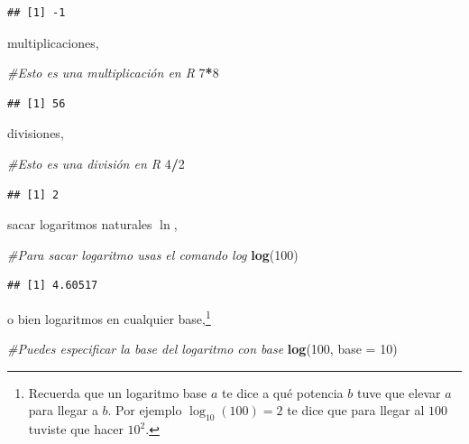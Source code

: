 \documentclass[
]{book}
\newenvironment{Shaded}{\begin{snugshade}}{\end{snugshade}}
\newcommand{\CommentTok}[1]{\textcolor[rgb]{0.56,0.35,0.01}{\textit{#1}}}
\newcommand{\DataTypeTok}[1]{\textcolor[rgb]{0.13,0.29,0.53}{#1}}
\newcommand{\DecValTok}[1]{\textcolor[rgb]{0.00,0.00,0.81}{#1}}
\newcommand{\KeywordTok}[1]{\textcolor[rgb]{0.13,0.29,0.53}{\textbf{#1}}}
\newcommand{\NormalTok}[1]{#1}
\newcommand{\OperatorTok}[1]{\textcolor[rgb]{0.81,0.36,0.00}{\textbf{#1}}}
\begin{document}
\begin{verbatim}
## [1] -1
\end{verbatim}

multiplicaciones,

\begin{Shaded}
\begin{Highlighting}[]
\CommentTok{#Esto es una multiplicación en R}
\DecValTok{7}\OperatorTok{*}\DecValTok{8}
\end{Highlighting}
\end{Shaded}

\begin{verbatim}
## [1] 56
\end{verbatim}

divisiones,

\begin{Shaded}
\begin{Highlighting}[]
\CommentTok{#Esto es una división en R}
\DecValTok{4}\OperatorTok{/}\DecValTok{2}
\end{Highlighting}
\end{Shaded}

\begin{verbatim}
## [1] 2
\end{verbatim}

sacar logaritmos naturales \(\ln\),

\begin{Shaded}
\begin{Highlighting}[]
\CommentTok{#Para sacar logaritmo usas el comando log}
\KeywordTok{log}\NormalTok{(}\DecValTok{100}\NormalTok{)}
\end{Highlighting}
\end{Shaded}

\begin{verbatim}
## [1] 4.60517
\end{verbatim}

o bien logaritmos en cualquier base,\footnote{Recuerda que un logaritmo base \(a\) te dice a qué potencia \(b\) tuve que elevar \(a\) para llegar a \(b\). Por ejemplo \(\log_{10}(100) = 2\) te dice que para llegar al \(100\) tuviste que hacer \(10^2\).}

\begin{Shaded}
\begin{Highlighting}[]
\CommentTok{#Puedes especificar la base del logaritmo con base }
\KeywordTok{log}\NormalTok{(}\DecValTok{100}\NormalTok{, }\DataTypeTok{base =} \DecValTok{10}\NormalTok{)}
\end{Highlighting}
\end{Shaded}
\end{document}

